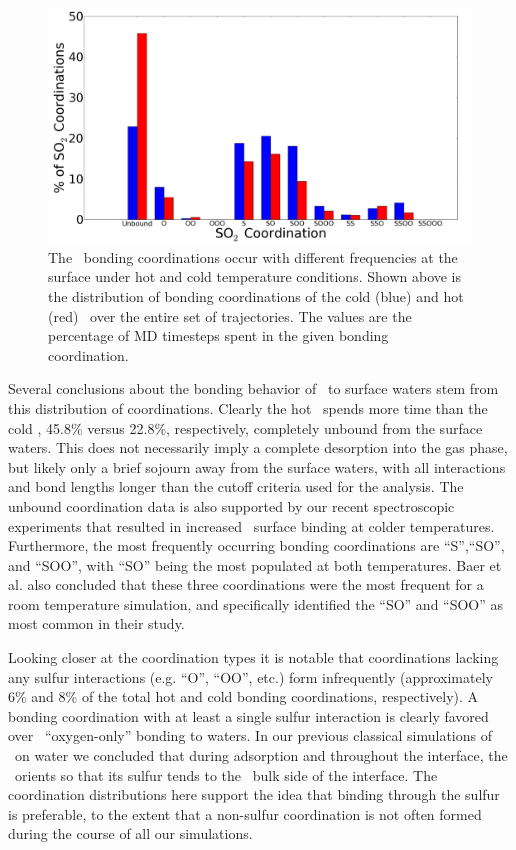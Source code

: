 \documentclass{article}
\begin{document}
\begin{figure}[h!]
	\begin{center}
		\includegraphics[scale=1.0]{coordination-distributions.png}
		\caption{The \suldiox~bonding coordinations occur with different frequencies at the surface under hot and cold temperature conditions. Shown above is the distribution of bonding coordinations of the cold (blue) and hot (red) \suldiox~over the entire set of trajectories. The values are the percentage of MD timesteps spent in the given bonding coordination.}
		\label{fig:bonding-coordinations}
	\end{center}
\end{figure}

	Several conclusions about the bonding behavior of \suldiox~to surface waters stem from this distribution of coordinations. Clearly the hot \suldiox~spends more time than the cold \suldiox, 45.8\% versus 22.8\%, respectively, completely unbound from the surface waters. This does not necessarily imply a complete desorption into the gas phase, but likely only a brief sojourn away from the surface waters, with all interactions and bond lengths longer than the cutoff criteria used for the analysis. The unbound coordination data is also supported by our recent spectroscopic experiments that resulted in increased \suldiox~surface binding at colder temperatures.\cite{Ota2011} Furthermore, the most frequently occurring bonding coordinations are ``S'',``SO'', and ``SOO'', with ``SO'' being the most populated at both temperatures. Baer et al. also concluded that these three coordinations were the most frequent for a room temperature simulation, and specifically identified the ``SO'' and ``SOO'' as most common in their study.\cite{Baer2010}

	Looking closer at the coordination types it is notable that coordinations lacking any sulfur interactions (e.g. ``O'', ``OO'', etc.) form infrequently (approximately 6\% and 8\% of the total hot and cold bonding coordinations, respectively). A bonding coordination with at least a single sulfur interaction is clearly favored over \suldiox~``oxygen-only'' bonding to waters. In our previous classical simulations of \suldiox~on water we concluded that during adsorption and throughout the interface, the \suldiox~orients so that its sulfur tends to the \wat~bulk side of the interface.\cite{Shamay2011} The coordination distributions here support the idea that binding through the sulfur is preferable, to the extent that a non-sulfur coordination is not often formed during the course of all our simulations.
\end{document}
